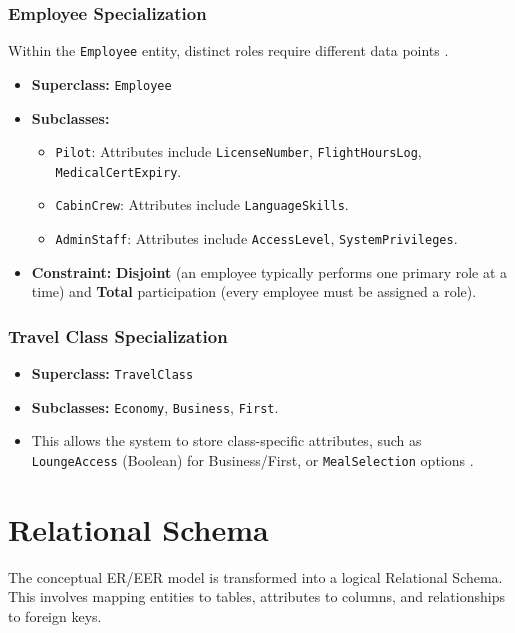 \documentclass[12pt, a4paper]{article}
\begin{document}
	\subsubsection{Employee Specialization}
	Within the \texttt{Employee} entity, distinct roles require different data points \cite{ref39}.
	\begin{itemize}
		\item \textbf{Superclass:} \texttt{Employee}
		\item \textbf{Subclasses:}
		\begin{itemize}
			\item \texttt{Pilot}: Attributes include \texttt{LicenseNumber}, \texttt{FlightHoursLog}, \texttt{MedicalCertExpiry}.
			\item \texttt{CabinCrew}: Attributes include \texttt{LanguageSkills}.
			\item \texttt{AdminStaff}: Attributes include \texttt{AccessLevel}, \texttt{SystemPrivileges}.
		\end{itemize}
		\item \textbf{Constraint:} \textbf{Disjoint} (an employee typically performs one primary role at a time) and \textbf{Total} participation (every employee must be assigned a role).
	\end{itemize}
	
	\subsubsection{Travel Class Specialization}
	\begin{itemize}
		\item \textbf{Superclass:} \texttt{TravelClass}
		\item \textbf{Subclasses:} \texttt{Economy}, \texttt{Business}, \texttt{First}.
		\item This allows the system to store class-specific attributes, such as \texttt{LoungeAccess} (Boolean) for Business/First, or \texttt{MealSelection} options \cite{ref44}.
	\end{itemize}
	
	\newpage
	\section{Relational Schema}
	
	The conceptual ER/EER model is transformed into a logical Relational Schema. This involves mapping entities to tables, attributes to columns, and relationships to foreign keys.
	
\end{document}
